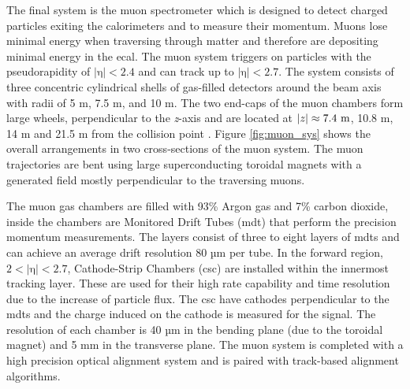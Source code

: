The final system is the muon spectrometer which is designed to detect charged particles exiting the calorimeters 
and to measure their momentum. Muons lose minimal energy when traversing through matter and therefore are depositing minimal energy in 
the \gls{ecal}. The muon system triggers on particles with the pseudorapidity of $|\textrm{η}| < \textrm{2.4}$ and can track up to $|\textrm{η}| < \textrm{2.7}$.
The system consists of three concentric cylindrical shells of gas-filled detectors around the beam axis with radii of 5 m, 7.5 m, and 10 m.
The two end-caps of the muon chambers form large wheels, perpendicular to the \textit{z}-axis and are located 
at $|\textrm{\textit{z}}| \approx \textrm{7.4 m}$, 10.8 m, 14 m and 21.5 m from the collision point \cite{atlas}.
Figure \ref{fig:muon_sys} shows the overall arrangements in two cross-sections of the muon system. The muon trajectories are bent 
using large superconducting toroidal magnets with a generated field mostly perpendicular to the traversing muons.  
\par
The muon gas chambers are filled with 93\% Argon gas and 7\% carbon dioxide, inside the chambers are Monitored Drift Tubes (\gls{mdt}) that perform the precision momentum measurements. The layers consist of three to eight layers 
of \gls{mdt}s and can achieve an average drift resolution 80 µm per tube. In the forward region, $\textrm{2} < |\textrm{η}| < \textrm{2.7}$, Cathode-Strip Chambers (\gls{csc})
are installed within the innermost tracking layer. These are used for their high rate capability and time resolution due to the increase of particle flux. The \gls{csc} have cathodes 
perpendicular to the \gls{mdt}s and the charge induced on the cathode is measured for the signal. The resolution of each chamber is 40 µm in the bending plane (due to the toroidal magnet) and 5 mm in the transverse plane. The muon system is completed with a high precision optical alignment system and is paired with track-based alignment algorithms. 

